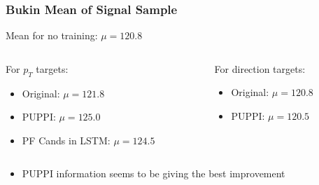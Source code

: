 \documentclass{beamer}
\begin{document}
\begin{frame}
  \frametitle{Bukin Mean of Signal Sample}

  Mean for no training: $\mu = 120.8$

  \vspace{12pt}

  \begin{columns}
    \begin{column}{0.5\linewidth}
      For $p_T$ targets:
      \begin{itemize}
      \item Original: $\mu = 121.8$
      \item PUPPI: $\mu = 125.0$
      \item PF Cands in LSTM: $\mu = 124.5$
      \end{itemize}
    \end{column}
    \begin{column}{0.5\linewidth}
      For direction targets:
      \begin{itemize}
      \item Original: $\mu = 120.8$
      \item PUPPI: $\mu = 120.5$
        \phantom{\item PF Cands in LSTM: \\ $\mu = 12.22$}
        \phantom{\item PF Cands in LSTM: \\ $\mu = 12.22$}
      \end{itemize}
    \end{column}
  \end{columns}

  \begin{itemize}
  \item PUPPI information seems to be giving the best improvement
  \end{itemize}


\end{frame}


\end{document}
